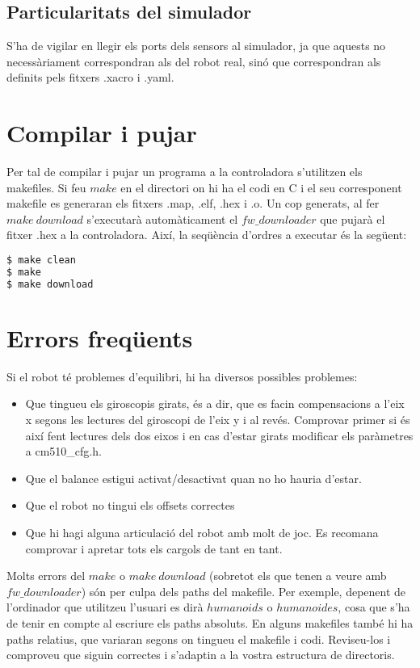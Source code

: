\documentclass{article}
\begin{document}
\subsection{Particularitats del simulador}
S'ha de vigilar en llegir els ports dels sensors al simulador, ja que aquests no necessàriament correspondran als del robot real, sinó que correspondran als definits pels fitxers .xacro i .yaml.


\section{Compilar i pujar}
Per tal de compilar i pujar un programa a la controladora s'utilitzen els makefiles.
Si feu $make$ en el directori on hi ha el codi en C i el seu corresponent makefile es generaran els fitxers .map, .elf, .hex i .o. Un cop generats, al fer $make\ download$ s'executarà automàticament el $fw\_downloader$ que pujarà el fitxer .hex a la controladora. Així, la seqüència d'ordres a executar és la següent:
\begin{lstlisting}[language=bash]
$ make clean
$ make
$ make download
\end{lstlisting}


\section{Errors freqüents}
Si el robot té problemes d'equilibri, hi ha diversos possibles problemes:
\begin{itemize}
	\item Que tingueu els giroscopis girats, és a dir, que es facin compensacions a l'eix x segons les lectures del giroscopi de l'eix y i al revés. Comprovar primer si és així fent lectures dels dos eixos i en cas d'estar girats modificar els paràmetres a cm510\_cfg.h.
	\item Que el balance estigui activat/desactivat quan no ho hauria d'estar.
	\item Que el robot no tingui els offsets correctes
	\item Que hi hagi alguna articulació del robot amb molt de joc. Es recomana comprovar i apretar tots els cargols de tant en tant.
\end{itemize}

Molts errors del $make$ o $make\ download$ (sobretot els que tenen a veure amb $fw\_downloader$) són per culpa dels paths del makefile. Per exemple, depenent de l'ordinador que utilitzeu l'usuari es dirà $humanoids$ o $humanoides$, cosa que s'ha de tenir en compte al escriure els paths absoluts. En alguns makefiles també hi ha paths relatius, que variaran segons on tingueu el makefile i codi.  Reviseu-los i comproveu que siguin correctes i s'adaptin a la vostra estructura de directoris. 
\end{document}
